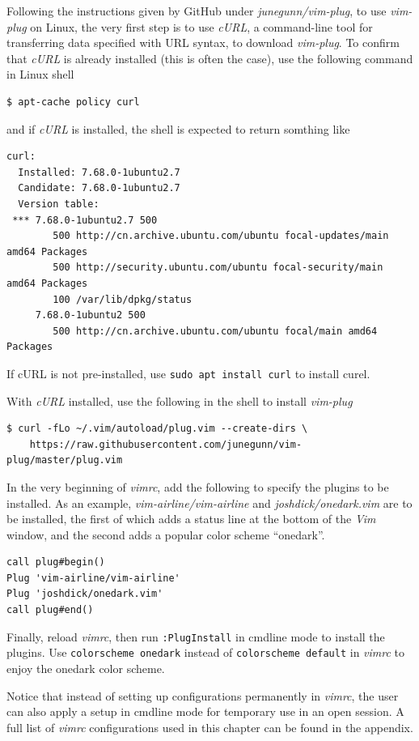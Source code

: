 Following the instructions given by GitHub under \textit{junegunn/vim-plug}, to use \textit{vim-plug} on Linux, the very first step is to use \textit{cURL}, a command-line tool for transferring data specified with URL syntax, to download \textit{vim-plug}. To confirm that \textit{cURL} is already installed (this is often the case), use the following command in Linux shell
\begin{lstlisting}
$ apt-cache policy curl
\end{lstlisting}
and if \textit{cURL} is installed, the shell is expected to return somthing like
\begin{lstlisting}
curl:
  Installed: 7.68.0-1ubuntu2.7
  Candidate: 7.68.0-1ubuntu2.7
  Version table:
 *** 7.68.0-1ubuntu2.7 500
        500 http://cn.archive.ubuntu.com/ubuntu focal-updates/main amd64 Packages
        500 http://security.ubuntu.com/ubuntu focal-security/main amd64 Packages
        100 /var/lib/dpkg/status
     7.68.0-1ubuntu2 500
        500 http://cn.archive.ubuntu.com/ubuntu focal/main amd64 Packages
\end{lstlisting}
If cURL is not pre-installed, use \verb|sudo apt install curl| to install curel.

With \textit{cURL} installed, use the following in the shell to install \textit{vim-plug}
\begin{lstlisting}
$ curl -fLo ~/.vim/autoload/plug.vim --create-dirs \
    https://raw.githubusercontent.com/junegunn/vim-plug/master/plug.vim
\end{lstlisting}
In the very beginning of \textit{vimrc}, add the following to specify the plugins to be installed. As an example, \textit{vim-airline/vim-airline} and \textit{joshdick/onedark.vim} are to be installed, the first of which adds a status line at the bottom of the \textit{Vim} window, and the second adds a popular color scheme ``onedark''.
\begin{lstlisting}
call plug#begin()
Plug 'vim-airline/vim-airline'
Plug 'joshdick/onedark.vim'
call plug#end()
\end{lstlisting}
Finally, reload \textit{vimrc}, then run \verb|:PlugInstall| in cmdline mode to install the plugins. Use \verb|colorscheme onedark| instead of \verb|colorscheme default| in \textit{vimrc} to enjoy the onedark color scheme.

Notice that instead of setting up configurations permanently in \textit{vimrc}, the user can also apply a setup in cmdline mode for temporary use in an open session. A full list of \textit{vimrc} configurations used in this chapter can be found in the appendix.

